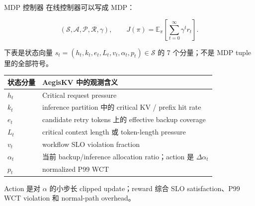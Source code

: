 \documentclass[aspectratio=43]{beamer}
\newcommand{\Critical}{Critical}
\begin{document}
\begin{frame}{MDP 控制器}
  \small
  在线控制器可以写成 MDP：

  \vspace{0.04cm}
  \[
    (\mathcal{S},\mathcal{A},\mathcal{P},\mathcal{R},\gamma),
    \qquad
    J(\pi)=\mathbb{E}_{\pi}\left[\sum_{t=0}^{\infty}\gamma^t r_t\right].
  \]

  \vspace{-0.08cm}
  \scriptsize
  下表是状态向量
  $s_t=(h_t,k_t,e_t,L_t,v_t,\alpha_t,p_t)\in\mathcal{S}$ 的 7 个分量；不是 MDP tuple 里的全部符号。

  \vspace{0.04cm}
  \renewcommand{\arraystretch}{1.10}
  \begin{tabular}{p{}p{}}
    \toprule
    状态分量 & AegisKV 中的观测含义 \\
    \midrule
    $h_t$ & \Critical{} request pressure \\
    $k_t$ & inference partition 中的 critical KV / prefix hit rate \\
    $e_t$ & candidate retry tokens 上的 effective backup coverage \\
    $L_t$ & critical context length 或 token-length pressure \\
    $v_t$ & workflow SLO violation fraction \\
    $\alpha_t$ & 当前 backup/inference allocation ratio；action 是 $\Delta\alpha_t$ \\
    $p_t$ & normalized P99 WCT \\
    \bottomrule
  \end{tabular}

  \vspace{0.08cm}
  \footnotesize
  Action 是对 $\alpha$ 的小步长 clipped update；reward 综合 SLO satisfaction、P99 WCT violation 和 normal-path overhead。
\end{frame}
\end{document}
